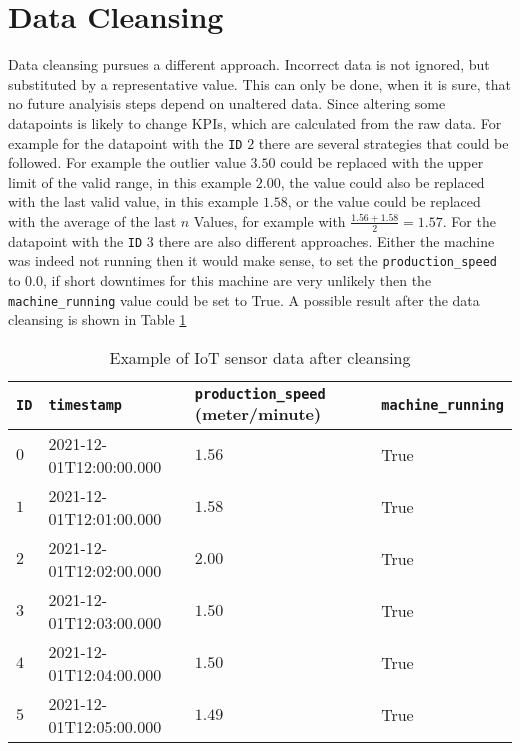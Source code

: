 \section{Data Cleansing}
Data cleansing pursues a different approach. Incorrect data is not ignored, but substituted by a representative value. This can only be done, when it is sure, that no future analyisis steps depend on unaltered data. Since altering some datapoints is likely to change \acp{KPI}, which are calculated from the raw data.
For example for the datapoint with the \verb|ID| $2$ there are several strategies that could be followed. For example the outlier value $3.50$ could be replaced with the upper limit of the valid range, in this example $2.00$, the value could also be replaced with the last valid value, in this example $1.58$, or the value could be replaced with the average of the last $n$ Values, for example with $\frac{1.56+1.58}{2} = 1.57$. For the datapoint with the \verb|ID| $3$ there are also different approaches. Either the machine was indeed not running then it would make sense, to set the \verb|production_speed| to $0.0$, if short downtimes for this machine are very unlikely then the \verb|machine_running| value could be set to True. A possible result after the data cleansing is shown in Table \ref{table:example-iot-data-after-cleansing} \cite{maleticDataCleansingIntegrity2000}
\begin{table}[ht]
\begin{tabular}{|l|l|l|l|}
\hline
\verb|ID| & \verb|timestamp|        & \verb|production_speed| (meter/minute) & \verb|machine_running| \\ \hline
$0$       & 2021-12-01T12:00:00.000 & $1.56$                                 & True                   \\ \hline
$1$       & 2021-12-01T12:01:00.000 & $1.58$                                 & True                   \\ \hline
$2$       & 2021-12-01T12:02:00.000 & $2.00$                                 & True                   \\ \hline
$3$       & 2021-12-01T12:03:00.000 & $1.50$                                 & True                   \\ \hline
$4$       & 2021-12-01T12:04:00.000 & $1.50$                                 & True                   \\ \hline
$5$       & 2021-12-01T12:05:00.000 & $1.49$                                 & True                   \\ \hline
\end{tabular}
\caption{Example of IoT sensor data after cleansing}
\label{table:example-iot-data-after-cleansing}
\end{table}